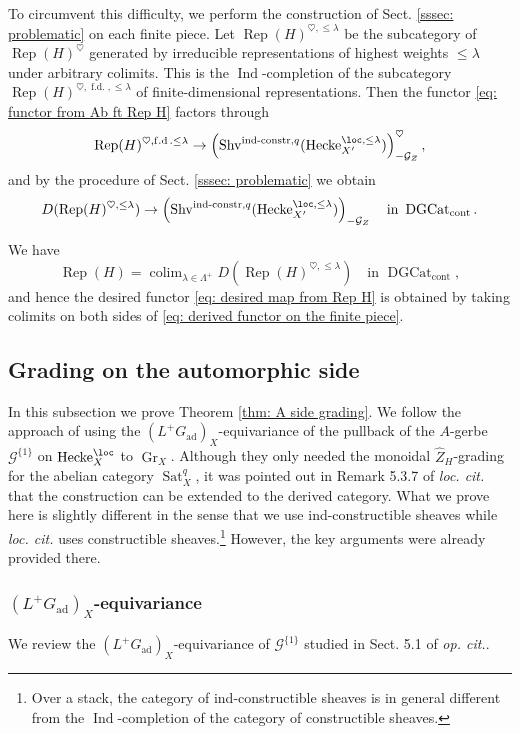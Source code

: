 \documentclass[10pt]{amsart}
\newcommand{\sssec}{\subsubsection}
\theoremstyle{remark}
\newcommand{\te}{\text}
\newcommand{\wh}{\widehat}
\newcommand{\on}{\operatorname}
\newcommand{\cG}{\mathcal{G}}
\newcommand{\DGcat}{\on{DGCat}_{\on{cont}}}
\newcommand{\Rep}{\on{Rep}}
\newcommand{\Shv}{\on{Shv}}
\newcommand{\Sat}{\on{Sat}}
\DeclareMathOperator{\Ind}{Ind}
\DeclareMathOperator{\colim}{colim}
\newcommand{\Gr}{\on{Gr}}
\newcommand{\Hecke}{\on{Hecke}}
\begin{document}
To circumvent this difficulty, we perform the construction of Sect. \ref{sssec: problematic} on each finite piece. Let $\Rep(H)^{\heartsuit,\le\lambda}$ be the subcategory of $\Rep(H)^{\heartsuit}$ generated by irreducible representations of highest weights $\le \lambda$ under arbitrary colimits. This is the $\Ind$-completion of the subcategory $\Rep(H)^{\heartsuit,\on{f.d.},\le\lambda}$ of finite-dimensional representations. Then the functor \eqref{eq: functor from Ab ft Rep H} factors through
\[\Rep(H)^{\heartsuit,\on{f.d}.\le\lambda}\rightarrow \left(\Shv^{\on{ind-constr},q}(\Hecke^{\loc,\le\lambda}_{X'})\right)^{\heartsuit}_{-\cG_Z},\]
and by the procedure of Sect. \ref{sssec: problematic} we obtain
\begin{equation}\label{eq: derived functor on the finite piece}
    D(\Rep(H)^{\heartsuit,\le\lambda})\rightarrow \left(\Shv^{\on{ind-constr},q}(\Hecke^{\loc,\le\lambda}_{X'})\right)_{-\cG_Z} \quad\te{in }\DGcat.
\end{equation}

We have
\[\Rep(H)=\colim_{\lambda\in\Lambda^+} D(\Rep(H)^{\heartsuit,\le\lambda})\quad\te{in }\DGcat,\]
and hence the desired functor \eqref{eq: desired map from Rep H} is obtained by taking colimits on both sides of \eqref{eq: derived functor on the finite piece}.

   


\subsection{Grading on the automorphic side}\label{ssec: A side grading}
In this subsection we prove Theorem \ref{thm: A side grading}. We follow the approach of \cite{ZhaoNew} using the $(L^+G_{\on{ad}})_X$-equivariance of the pullback of the $A$-gerbe $\cG^{\{1\}}$ on $\Hecke^{\loc}_X$ to $\Gr_X$. Although they only needed the monoidal $\wh{Z}_H$-grading for the abelian category $\Sat^q_X$, it was pointed out in Remark 5.3.7 of \emph{loc. cit.} that the construction can be extended to the derived category. What we prove here is slightly different in the sense that we use ind-constructible sheaves while \emph{loc. cit.} uses constructible sheaves.\footnote{Over a stack, the category of ind-constructible sheaves is in general different from the $\Ind$-completion of the category of constructible sheaves.}  However, the key arguments were already provided there.

\sssec{$(L^+G_{\on{ad}})_X$-equivariance} 
We review the $(L^+G_{\on{ad}})_X$-equivariance of $\cG^{\{1\}}$ studied in Sect. 5.1 of \emph{op. cit.}.
\medskip
\end{document}
